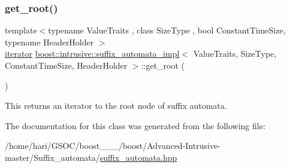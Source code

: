 \subsubsection{\texorpdfstring{get\+\_\+root()}{get\_root()}}
{\footnotesize\ttfamily template$<$typename Value\+Traits , class Size\+Type , bool Constant\+Time\+Size, typename Header\+Holder $>$ \\
\hyperlink{classboost_1_1intrusive_1_1suffix__automata__impl_af7c03e2d35758eb2040a589cc35cc36c}{iterator} \hyperlink{classboost_1_1intrusive_1_1suffix__automata__impl}{boost\+::intrusive\+::suffix\+\_\+automata\+\_\+impl}$<$ Value\+Traits, Size\+Type, Constant\+Time\+Size, Header\+Holder $>$\+::get\+\_\+root (\begin{DoxyParamCaption}{ }\end{DoxyParamCaption})\hspace{0.3cm}{\ttfamily [inline]}}

This returns an iterator to the root node of suffix automata. 

The documentation for this class was generated from the following file\+:\begin{DoxyCompactItemize}
\item 
/home/hari/\+G\+S\+O\+C/boost\+\_\+\_\+\_/boost/\+Advanced-\/\+Intrusive-\/master/\+Suffix\+\_\+automata/\hyperlink{suffix__automata_8hpp}{suffix\+\_\+automata.\+hpp}\end{DoxyCompactItemize}
